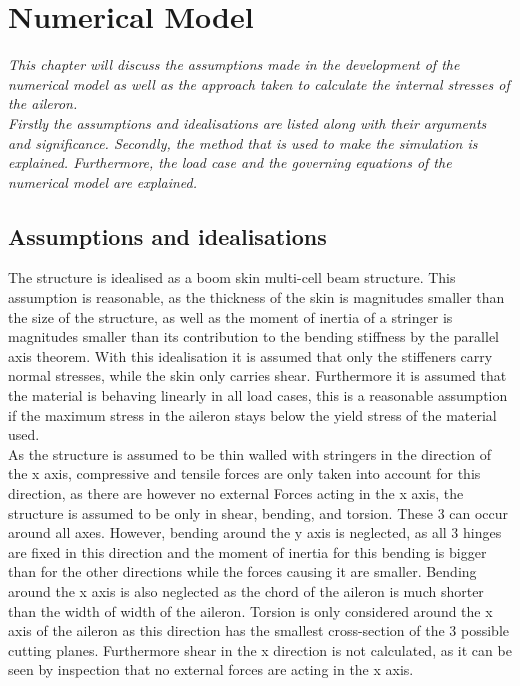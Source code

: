 \section{Numerical Model}
\label{sec:numerical_model}
\textit{This chapter will discuss the assumptions made in the development of the numerical model as well as the approach taken to calculate the internal stresses of the aileron.\\
Firstly the assumptions and idealisations are listed along with their arguments and significance. Secondly, the method that is used to make the simulation is explained. Furthermore, the load case and the governing equations of the numerical model are explained.}

\subsection{Assumptions and idealisations}
\label{subsec:assumptions_numerical}
The structure is idealised as a boom skin multi-cell beam structure. This assumption is reasonable, as the thickness of the skin is magnitudes smaller than the size of the structure, as well as the moment of inertia of a stringer is magnitudes smaller than its contribution to the bending stiffness by the parallel axis theorem. With this idealisation it is assumed that only the stiffeners carry normal stresses, while the skin only carries shear. Furthermore it is assumed that the material is behaving linearly in all load cases, this is a reasonable assumption if the maximum stress in the aileron stays below the yield stress of the material used.\\

\noindent As the structure is assumed to be thin walled with stringers in the direction of the x axis, compressive and tensile forces are only taken into account for this direction, as there are however no external Forces acting in the x axis, the structure is assumed to be only in shear, bending, and torsion. These 3 can occur around all axes. However, bending around the y axis is neglected, as all 3 hinges are fixed in this direction and the moment of inertia for this bending is bigger than for the other directions while the forces causing it are smaller. Bending around the x axis is also neglected as the chord of the aileron is much shorter than the width of width of the aileron. Torsion is only considered around the x axis of the aileron as this direction has the smallest cross-section of the 3 possible cutting planes. Furthermore shear in the x direction is not calculated, as it can be seen by inspection that no external forces are acting in the x axis.

